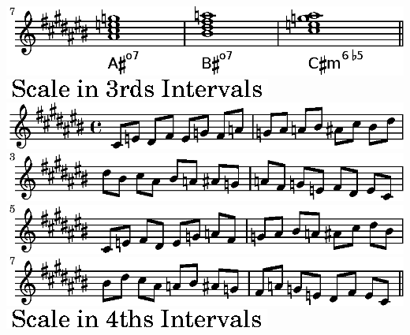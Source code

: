 \ifx\betweenLilyPondSystem \undefined
  \linebreak
\else
  \expandafter{}%
\fi
\includegraphics{88/lily-44fe9253-8}%
\ifx\betweenLilyPondSystem \undefined
  \linebreak
\else
  \expandafter{}%
\fi
\includegraphics{88/lily-44fe9253-9}%
\ifx\betweenLilyPondSystem \undefined
  \linebreak
\else
  \expandafter{}%
\fi
\includegraphics{88/lily-44fe9253-10}%
\ifx\betweenLilyPondSystem \undefined
  \linebreak
\else
  \expandafter{}%
\fi
\includegraphics{88/lily-44fe9253-11}%
\ifx\betweenLilyPondSystem \undefined
  \linebreak
\else
  \expandafter{}%
\fi
\includegraphics{88/lily-44fe9253-12}%
\ifx\betweenLilyPondSystem \undefined
  \linebreak
\else
  \expandafter{}%
\fi
\includegraphics{88/lily-44fe9253-13}%
\ifx\betweenLilyPondSystem \undefined
  \linebreak
\else
  \expandafter{}%
\fi
\includegraphics{88/lily-44fe9253-14}%
